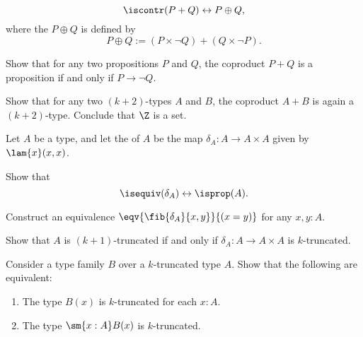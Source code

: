 \begin{exercises}
\begin{subexenum}
    \begin{equation*}
      \iscontr(P+Q)\leftrightarrow P\oplus Q,
    \end{equation*}
    where the  $P\oplus Q$ is defined by
    \begin{equation*}
      P\oplus Q:= (P\times\neg Q)+(Q\times\neg P).
    \end{equation*}
  \item \label{ex:is-prop-coproduct}Show that for any two propositions $P$ and $Q$, the coproduct $P+Q$ is a proposition if and only if $P\to \neg Q$.
  \item Show that for any two $(k+2)$-types $A$ and $B$, the coproduct $A+B$ is again a $(k+2)$-type. Conclude that $\Z$ is a set.
  \end{subexenum}
  \exitem \label{ex:diagonal}Let $A$ be a type, and let the  of $A$ be the map $\delta_A:A\to A\times A$ given by $\lam{x}(x,x)$. 
  \begin{subexenum}
  \item Show that
    \begin{equation*}
      {\isequiv(\delta_A)}\leftrightarrow{\isprop(A)}.
    \end{equation*}
  \item Construct an equivalence $\eqv{\fib{\delta_A}{x,y}}{(x=y)}$ for any $x,y:A$.
  \item Show that $A$ is $(k+1)$-truncated if and only if $\delta_A:A\to A\times A$ is $k$-truncated.
  \end{subexenum}
  \exitem \label{ex:istrunc_sigma}
  \begin{subexenum}
  \item Consider a type family $B$ over a $k$-truncated type $A$. Show that the following are equivalent:
    \begin{enumerate}
    \item The type $B(x)$ is $k$-truncated for each $x:A$.
    \item The type $\sm{x:A}B(x)$ is $k$-truncated.

\end{enumerate}
\end{subexenum}
\end{exercises}
